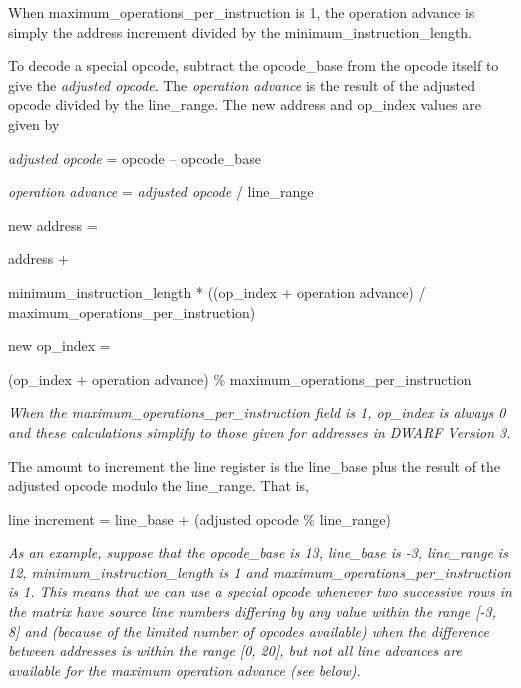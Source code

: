 When maximum\_operations\_per\_instruction is 1, the operation
advance is simply the address increment divided by the
minimum\_instruction\_length.

To decode a special opcode, subtract the opcode\_base from
the opcode itself to give the \textit{adjusted opcode}. 
The \textit{operation advance} 
is the result of the adjusted opcode divided by the
line\_range. The new address and op\_index values are given by
\begin{myindentpara}{1cm}

\textit{adjusted opcode} = opcode – opcode\_base

\textit{operation advance} = \textit{adjusted opcode} / line\_range

\begin{myindentpara}{1cm}
new address =

address +

minimum\_instruction\_length *
((op\_index + operation advance) / 
maximum\_operations\_per\_instruction)
\end{myindentpara}
new op\_index =

\begin{myindentpara}{1cm}
(op\_index + operation advance) \% maximum\_operations\_per\_instruction
\end{myindentpara}

\end{myindentpara}

\textit{When the maximum\_operations\_per\_instruction field is 1,
op\_index is always 0 and these calculations simplify to those
given for addresses in DWARF Version 3.}

The amount to increment the line register is the line\_base plus
the result of the adjusted opcode modulo the line\_range. That
is,

\begin{myindentpara}{1cm}
line increment = line\_base + (adjusted opcode \% line\_range)
\end{myindentpara}

\textit{As an example, suppose that the opcode\_base is 13, line\_base
is -3, line\_range is 12, minimum\_instruction\_length is 1
and maximum\_operations\_per\_instruction is 1. This means that
we can use a special opcode whenever two successive rows in
the matrix have source line numbers differing by any value
within the range [-3, 8] and (because of the limited number
of opcodes available) when the difference between addresses
is within the range [0, 20], but not all line advances are
available for the maximum operation advance (see below).}

